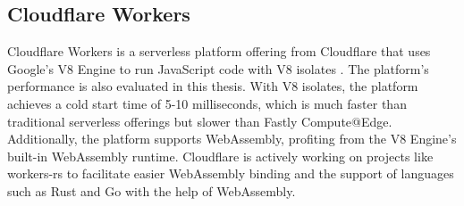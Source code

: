\subsection{Cloudflare Workers}
\label{subsec:cloudflare-workers}

Cloudflare Workers is a serverless platform offering from Cloudflare that uses Google's V8 Engine to run JavaScript code with V8 isolates \cite{partovi_2020_eliminating}. The platform's performance is also evaluated in this thesis. With V8 isolates, the platform achieves a cold start time of 5-10 milliseconds, which is much faster than traditional serverless offerings but slower than Fastly Compute@Edge. Additionally, the platform supports WebAssembly, profiting from the V8 Engine's built-in WebAssembly runtime. Cloudflare is actively working on projects like workers-rs to facilitate easier WebAssembly binding and the support of languages such as Rust and Go with the help of WebAssembly.
